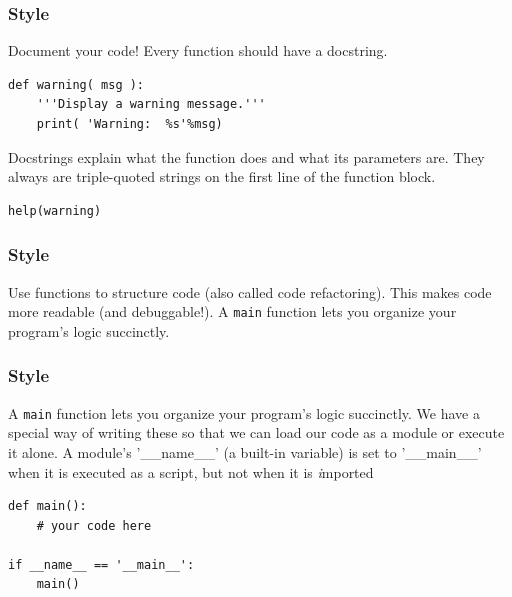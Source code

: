 \documentclass[11pt]{beamer}
\begin{document}
\begin{frame}[fragile]
  \frametitle{Style}
  \Enlarge

  \begin{enumerate}
  \myitem  Document your code!
  \myitem  Every function should have a docstring.
  \end{enumerate}
  \begin{Verbatim}
def warning( msg ):
    '''Display a warning message.'''
    print( 'Warning:  %s'%msg)
  \end{Verbatim}
  \begin{enumerate}
  \myitem  Docstrings explain what the function does and what its parameters are.
  \myitem  They always are triple-quoted strings on the first line of the function block.
  \end{enumerate}
  \begin{Verbatim}
help(warning)
  \end{Verbatim}
\end{frame}

\begin{frame}[fragile]
  \frametitle{Style}
  \Enlarge

  \begin{enumerate}
  \myitem  Use functions to structure code (also called code refactoring).
  \myitem  This makes code more readable (and debuggable!).
  \myitem  A \texttt{main} function lets you organize your program's logic succinctly.
  \end{enumerate}
\end{frame}


\begin{frame}[fragile]
  \frametitle{Style}
  \Enlarge

  \begin{enumerate}
  \myitem  A \texttt{main} function lets you organize your program's logic succinctly.
  \myitem  We have a special way of writing these so that we can load our code as a module or execute it alone.
  \myitem  A module's '\_\_name\_\_' (a built-in variable) is set to '\_\_main\_\_' when it is executed as a script, but not when it is {\emph imported}
  \end{enumerate}
  \begin{Verbatim}
def main():
    # your code here

if __name__ == '__main__':
    main()
  \end{Verbatim}
\end{frame}
\end{document}
